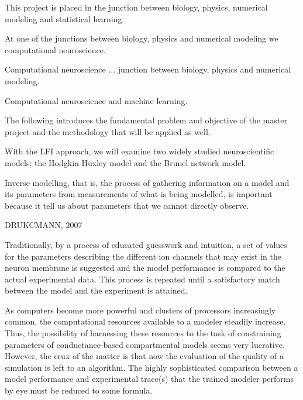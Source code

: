 This project is placed in the junction between biology, physics, numerical modeling and statistical learning 


At one of the junctions between biology, physics and numerical modeling we computational neuroscience. 

Computational neuroscience ... junction between biology, physics and numerical modeling. 

Computational neuroscience and machine learning. 

The following introduces the fundamental problem and objective of the master project and the methodology that will be applied as well.


With the LFI approach, we will examine two widely studied neuroscientific models; the Hodgkin-Huxley model and the Brunel network model. 


Inverse modelling, that is, the process of gathering information on a model and its parameters from measurements of what is being modelled, is important because it tell us about parameters that we cannot directly observe.  


DRUKCMANN, 2007 

Traditionally, by a process of educated guesswork and intuition, a set of values for the parameters describing the different ion channels that may exist in the neuron membrane is suggested and the model performance is compared to the actual experimental data. This process is repeated until a satisfactory match between the model and the experiment is attained.

As computers become more powerful and clusters of processors increasingly common, the computational resources available to a modeler steadily increase. Thus, the possibility of harnessing these resources to the task of constraining parameters of conductance-based compartmental models seems very lucrative. However, the crux of the matter is that now the evaluation of the quality of a simulation is left to an algorithm. The highly sophisticated comparison between a model performance and experimental trace(s) that the trained modeler performs by eye must be reduced to some formula.



